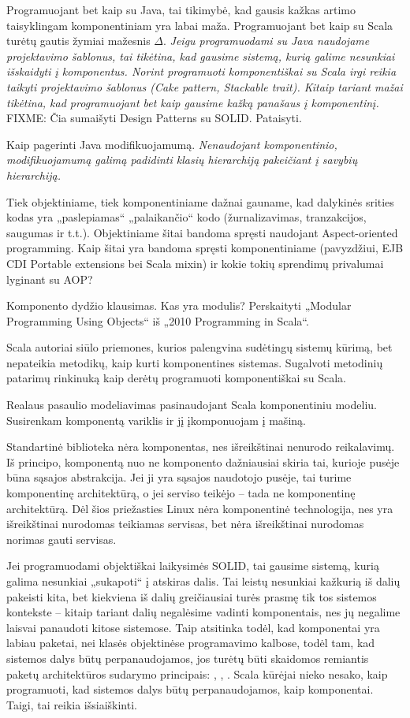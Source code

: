 Programuojant bet kaip su Java, tai tikimybė, kad gausis kažkas artimo
taisyklingam komponentiniam yra labai maža. Programuojant bet kaip su
Scala turėtų gautis žymiai mažesnis $\Delta$. \emph{Jeigu programuodami
su Java naudojame projektavimo šablonus, tai tikėtina, kad gausime
sistemą, kurią galime nesunkiai išskaidyti į komponentus. Norint
programuoti komponentiškai su Scala irgi reikia taikyti projektavimo
šablonus (Cake pattern, Stackable trait). Kitaip tariant mažai tikėtina,
kad programuojant bet kaip gausime kažką panašaus į komponentinį.}
FIXME: Čia sumaišyti Design Patterns su SOLID. Pataisyti.

Kaip pagerinti Java modifikuojamumą. \emph{Nenaudojant komponentinio,
modifikuojamumą galimą padidinti klasių hierarchiją pakeičiant
į savybių hierarchiją.}

Tiek objektiniame, tiek komponentiniame dažnai gauname, kad dalykinės
srities kodas yra „paslepiamas“ „palaikančio“ kodo (žurnalizavimas,
tranzakcijos, saugumas ir t.t.). Objektiniame šitai bandoma spręsti
naudojant Aspect-oriented programming. Kaip šitai yra bandoma
spręsti komponentiniame (pavyzdžiui, EJB CDI Portable extensions
bei Scala mixin) ir kokie tokių sprendimų privalumai lyginant su AOP?

Komponento dydžio klausimas. Kas yra modulis? Perskaityti „Modular
Programming Using Objects“ iš „2010 Programming in Scala“.

Scala autoriai siūlo priemones, kurios palengvina sudėtingų sistemų
kūrimą, bet nepateikia metodikų, kaip kurti komponentines sistemas.
Sugalvoti metodinių patarimų rinkinuką kaip derėtų programuoti
komponentiškai su Scala.

Realaus pasaulio modeliavimas pasinaudojant Scala komponentiniu
modeliu. Susirenkam komponentą variklis ir jį įkomponuojam į
mašiną.

Standartinė biblioteka nėra komponentas, nes išreikštinai nenurodo
reikalavimų. Iš principo, komponentą nuo ne komponento dažniausiai
skiria tai, kurioje pusėje būna sąsajos abstrakcija. Jei ji yra
sąsajos naudotojo pusėje, tai turime komponentinę architektūrą, o
jei serviso teikėjo – tada ne komponentinę architektūrą. Dėl šios
priežasties Linux nėra komponentinė technologija, nes yra
išreikštinai nurodomas teikiamas servisas, bet nėra išreikštinai
nurodomas norimas gauti servisas.

Jei programuodami objektiškai laikysimės SOLID, tai gausime sistemą,
kurią galima nesunkiai „sukapoti“ į atskiras dalis. Tai leistų
nesunkiai kažkurią iš dalių pakeisti kita, bet kiekviena iš dalių
greičiausiai turės prasmę tik tos sistemos kontekste – kitaip
tariant dalių negalėsime vadinti komponentais, nes jų negalime
laisvai panaudoti kitose sistemose. Taip atsitinka todėl, kad
komponentai yra labiau paketai, nei klasės objektinėse programavimo
kalbose, todėl tam, kad sistemos dalys būtų perpanaudojamos, jos
turėtų būti skaidomos remiantis paketų architektūros sudarymo
principais: ,
, 
\cite[17]{design-principles-and-design-patterns}.
Scala kūrėjai nieko nesako, kaip programuoti, kad sistemos
dalys būtų perpanaudojamos, kaip komponentai. Taigi, tai reikia
išsiaiškinti.
